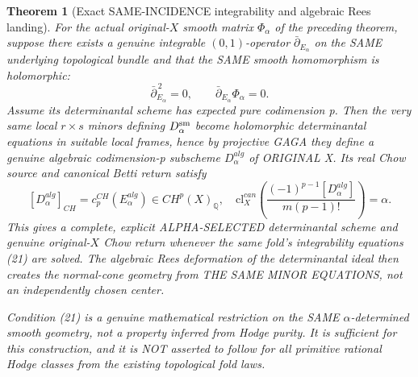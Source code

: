 \documentclass[11pt]{article}
\newtheorem{theorem}{Theorem}
\begin{document}
\begin{theorem}[Exact SAME-INCIDENCE integrability and algebraic Rees landing]
For the actual original-$X$ smooth
matrix $\Phi_\alpha$ of the
preceding theorem, suppose there
exists a genuine integrable
$(0,1)$-operator
$\bar\partial_{E_\alpha}$ on
the SAME underlying topological
bundle and that the SAME smooth
homomorphism is holomorphic:
\[
 \boxed{
 \bar\partial_{E_\alpha}^{\,2}=0,
 \qquad
 \bar\partial_{E_\alpha}
                \Phi_\alpha=0 .
 }                                                        \tag{21}
\]
Assume its determinantal scheme
has expected pure codimension p.
Then the very same local
$r\times s$ minors defining
$D_\alpha^{\rm sm}$ become
holomorphic determinantal
equations in suitable local
frames, hence by projective
GAGA they define a genuine
algebraic codimension-p
subscheme $D_\alpha^{alg}$
of ORIGINAL X. Its real
Chow source and canonical
Betti return satisfy
\[
 \boxed{
 [D_\alpha^{alg}]_{CH}
       =c_p^{CH}(E_\alpha^{alg})
                 \in CH^p(X)_{\mathbb Q},
 \quad
 \mathrm{cl}^{can}_X
   \left(
   \frac{(-1)^{p-1}[D_\alpha^{alg}]}
                    {m(p-1)!}
   \right)=\alpha .
 }                                                        \tag{22}
\]
This gives a complete, explicit
ALPHA-SELECTED determinantal
scheme and genuine original-$X$
Chow return whenever the same
fold's integrability equations
(21) are solved. The algebraic
Rees deformation of the
determinantal ideal then creates
the normal-cone geometry from
THE SAME MINOR EQUATIONS, not
an independently chosen center.

Condition (21) is a genuine
mathematical restriction on the
SAME $\alpha$-determined smooth
geometry, not a property
inferred from Hodge purity.
It is sufficient for this
construction, and it is NOT
asserted to follow for all
primitive rational Hodge
classes from the existing
topological fold laws.
\end{theorem}
\end{document}
